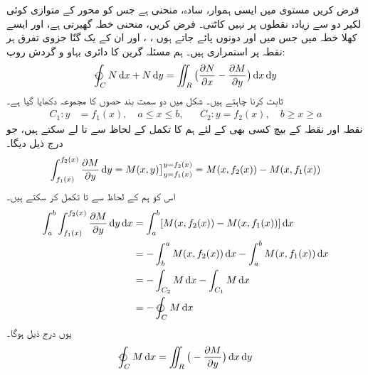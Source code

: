  فرض کریں مستوی  میں     ایسی ہموار، سادہ، منحنی  ہے جس کو محور کے متوازی   کوئی   لکیر دو  سے زیادہ نقطوں پر  نہیں کاٹتی۔  فرض کریں، منحنی    خطہ      گھیرتی    ہے، اور ایسے کھلا خطہ میں جس میں   اور   دونوں  پائے جاتے ہوں ، ،   اور ان کے یک گنّا جزوی تفرق  ہر نقطہ پر استمراری ہیں۔ ہم مسئلہ گرین کا دائری  بہاو  و  گردش روپ:
\begin{align}\label{مساوات_سمتی_تکمل_خصوصی_پر_ثبوت}
\varointctrclockwise_C N \dif x + N \dif y = \iint_R \big(\frac{\partial N}{\partial x} - \frac{\partial M}{\partial y}\big) \dif x \dif y 
\end{align}
 ثابت کرنا چاہتے  ہیں۔     شکل       میں    دو سمت بند حصوں کا مجموعہ    دکھایا گیا ہے۔  
\begin{align*}
     C_1: y &= f_1(x), \quad  a \leq x \leq b, && C_2:  y = f_2(x), \quad  b \geq x \geq a 
\end{align*}
 نقطہ   اور    نقطہ  کے بیچ کسی بھی    کے لئے ہم   کا تکمل    کے لحاظ سے   تا     لے سکتے ہیں، جو درج ذیل دیگا۔ 
 \begin{align}
 \int_{f_1(x)}^{f_2(x)} \frac{\partial M}{\partial y}\dif y= M(x,y) \big]_{y=f_1(x)}^{y=f_2(x)}=M(x,f_2(x))-M(x,f_1(x))
 \end{align}
 اس کو ہم     کے لحاظ سے   تا      تکمل کر سکتے ہیں۔ 
\begin{align*}
\int_a^b \int_{f_1(x)}^{f_2(x)}\frac{\partial M}{\partial y} \dif y \dif x&= \int_{a}^{b}[M(x, f_2(x)) - M(x, f_1(x))] \dif x \\     &= - \int_{b}^{a} M(x, f_2(x)) \dif x - \int_{a}^{b} M(x, f_1(x)) \dif x \\     &= - \int_{C_2} M \dif x -\int_{C_1} M \dif x \\     &= -\varointctrclockwise_C M \dif x 
\end{align*}
 یوں درج ذیل ہوگا۔ 
\begin{align}\label{مساوات_سمتی_تکمل_آدھا_الف}
\varointctrclockwise_C M \dif x = \iint_R \big(-\frac{\partial M}{\partial y}\big) \dif x \dif y 
\end{align}

